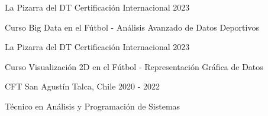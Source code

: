 \documentclass[]{awesome-cv}
\begin{document}
\begin{cventries}
	\vspace{-5mm}
	
\end{cventries}

\vspace{4mm}
\begin{cventries}
	\vspace{-3mm}
	\cventry
	{}
	{La Pizarra del DT \vspace{-5mm}}
	{Certificación Internacional \vspace{-5mm}}
	{2023 \vspace{-5mm}}
	{\begin{cvsectionnormaltext} 
		\item{Curso Big Data en el Fútbol - Análisis Avanzado de Datos Deportivos}
	\end{cvsectionnormaltext}}

	\vspace{-3mm}
	\cventry
	{}
	{La Pizarra del DT \vspace{-5mm}}
	{Certificación Internacional \vspace{-5mm}}
	{2023 \vspace{-5mm}}
	{\begin{cvsectionnormaltext} 
		\item{Curso Visualización 2D en el Fútbol - Representación Gráfica de Datos}
	\end{cvsectionnormaltext}}

	\vspace{-3mm}
	\cventry
	{}
	{CFT San Agustín \vspace{-5mm}}
	{Talca, Chile \vspace{-5mm}}
	{2020 - 2022 \vspace{-5mm}}
	{\begin{cvsectionnormaltext} 
		\item{Técnico en Análisis y Programación de Sistemas}
	\end{cvsectionnormaltext}}
\end{cventries}
\end{document}
